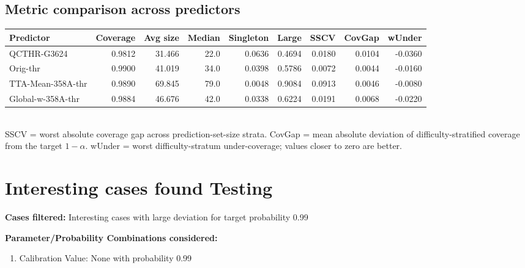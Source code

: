 \documentclass[parskip=half]{scrartcl}
\begin{document}
\subsection{Metric comparison across predictors}
\begin{tabular}{l r r r r r r r r}
\hline
Predictor & Coverage & Avg size & Median & Singleton & Large & SSCV & CovGap & wUnder \\
\hline
QCTHR-G3624 & 0.9812 & 31.466 & 22.0 & 0.0636 & 0.4694 & 0.0180 & 0.0104 & -0.0360 \\
Orig-thr & 0.9900 & 41.019 & 34.0 & 0.0398 & 0.5786 & 0.0072 & 0.0044 & -0.0160 \\
TTA-Mean-358A-thr & 0.9890 & 69.845 & 79.0 & 0.0048 & 0.9084 & 0.0913 & 0.0046 & -0.0080 \\
Global-w-358A-thr & 0.9884 & 46.676 & 42.0 & 0.0338 & 0.6224 & 0.0191 & 0.0068 & -0.0220 \\
\hline
\end{tabular}\\[0.5em]
\textsf{\scriptsize SSCV = worst absolute coverage gap across prediction-set-size strata. CovGap = mean absolute deviation of difficulty-stratified coverage from the target $1-\alpha$. wUnder = worst difficulty-stratum under-coverage; values closer to zero are better.}\\
\section{Interesting cases found Testing}
\textbf{Cases filtered:} Interesting cases with large deviation for target probability 0.99


\textbf{Parameter/Probability Combinations considered:}\begin{enumerate}
\item Calibration Value: None with probability 0.99
\end{enumerate}
        
\end{document}
